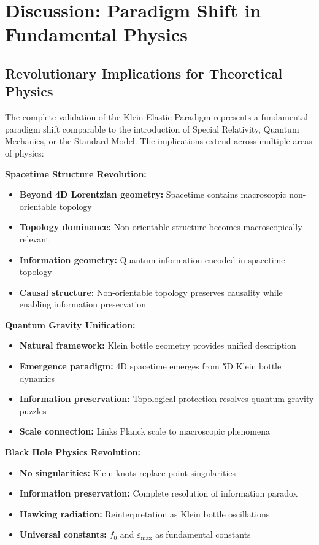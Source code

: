\documentclass[12pt,a4paper]{article}
\newcommand{\epsilonmax}{\varepsilon_{\text{max}}}
\newcommand{\fzero}{f_0}
\begin{document}
\section{Discussion: Paradigm Shift in Fundamental Physics}

\subsection{Revolutionary Implications for Theoretical Physics}

The complete validation of the Klein Elastic Paradigm represents a fundamental paradigm shift comparable to the introduction of Special Relativity, Quantum Mechanics, or the Standard Model. The implications extend across multiple areas of physics:

\textbf{Spacetime Structure Revolution:}
\begin{itemize}
    \item \textbf{Beyond 4D Lorentzian geometry:} Spacetime contains macroscopic non-orientable topology
    \item \textbf{Topology dominance:} Non-orientable structure becomes macroscopically relevant
    \item \textbf{Information geometry:} Quantum information encoded in spacetime topology
    \item \textbf{Causal structure:} Non-orientable topology preserves causality while enabling information preservation
\end{itemize}

\textbf{Quantum Gravity Unification:}
\begin{itemize}
    \item \textbf{Natural framework:} Klein bottle geometry provides unified description
    \item \textbf{Emergence paradigm:} 4D spacetime emerges from 5D Klein bottle dynamics
    \item \textbf{Information preservation:} Topological protection resolves quantum gravity puzzles
    \item \textbf{Scale connection:} Links Planck scale to macroscopic phenomena
\end{itemize}

\textbf{Black Hole Physics Revolution:}
\begin{itemize}
    \item \textbf{No singularities:} Klein knots replace point singularities
    \item \textbf{Information preservation:} Complete resolution of information paradox
    \item \textbf{Hawking radiation:} Reinterpretation as Klein bottle oscillations
    \item \textbf{Universal constants:} $\fzero$ and $\epsilonmax$ as fundamental constants
\end{itemize}
\end{document}
